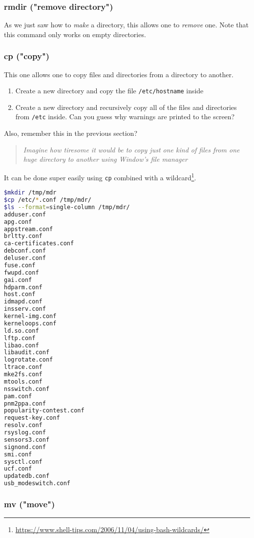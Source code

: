 \documentclass[12pt]{article}
\begin{document}
\subsubsection{rmdir ("remove directory")}

As we just saw how to \textit{make} a directory, this allows one to \textit{remove} one.
Note that this command only works on empty directories.

\subsubsection{cp ("copy")}

This one allows one to copy files and directories from a directory to another.
\begin{enumerate}
\item Create a new directory and copy the file \texttt{/etc/hostname} inside
\item Create a new directory and recursively copy all of the files and directories from \texttt{/etc} inside. Can you guess why warnings are printed to the screen?
\end{enumerate}

Also, remember this in the previous section?

\begin{quote}
\textit{Imagine how tiresome it would be to copy just one kind of files from one huge directory to another using Window's file manager}
\end{quote}

It can be done super easily using \texttt{cp} combined with a wildcard\footnote{\url{https://www.shell-tips.com/2006/11/04/using-bash-wildcards/}}.

\begin{lstlisting}[language=bash]
$mkdir /tmp/mdr
$cp /etc/*.conf /tmp/mdr/
$ls --format=single-column /tmp/mdr/
adduser.conf
apg.conf
appstream.conf
brltty.conf
ca-certificates.conf
debconf.conf
deluser.conf
fuse.conf
fwupd.conf
gai.conf
hdparm.conf
host.conf
idmapd.conf
insserv.conf
kernel-img.conf
kerneloops.conf
ld.so.conf
lftp.conf
libao.conf
libaudit.conf
logrotate.conf
ltrace.conf
mke2fs.conf
mtools.conf
nsswitch.conf
pam.conf
pnm2ppa.conf
popularity-contest.conf
request-key.conf
resolv.conf
rsyslog.conf
sensors3.conf
signond.conf
smi.conf
sysctl.conf
ucf.conf
updatedb.conf
usb_modeswitch.conf
\end{lstlisting}

\subsubsection{mv ("move")}
\end{document}
